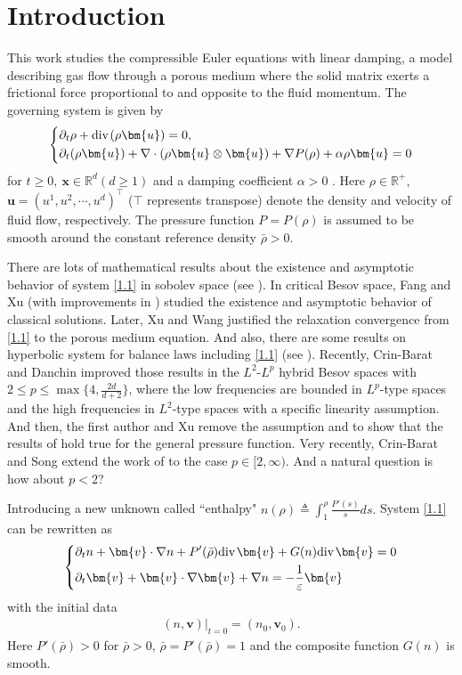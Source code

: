 \documentclass{amsart}
\theoremstyle{definition}
\theoremstyle{remark}
\numberwithin{equation}{section}
\def\d{\partial}
\renewcommand{\div}{\mbox{\rm div}\;\!}
\def\bu{{\bm{u} }}
\def\bx{\bm{x}}
\def\bv{{\bm{v} }}
\newcommand\R{\mathbb{R}}
\begin{document}
\section{Introduction}
This work studies the compressible Euler equations with linear damping, a model describing gas flow through a porous medium where the solid matrix exerts a frictional force proportional to and opposite to the fluid momentum. The governing system is given by
\begin{eqnarray}\label{1.1}
\left\{\aligned
&\d_t \rho+\div (\rho \bu)=0, \\
&\d_t (\rho \bu)+\nabla \cdot (\rho \bu\otimes \bu)+\nabla P(\rho)+\alpha\rho \bu=0
\endaligned\right.
\end{eqnarray}
for $t\geq0,\ \bx\in \R^d(d\geq 1)$ and a damping coefficient $\alpha>0$
. Here $\rho\in\mathbb{R}^{+}$, $\bu=(u^1, u^2,\cdots, u^d)^\top$ ($\top$ represents transpose) denote the density and velocity of fluid flow, respectively. The pressure function $P=P(\rho)$ is assumed to be smooth around the constant reference density $\bar{\rho}>0$.

There are lots of mathematical results about the existence and asymptotic behavior of system \eqref{1.1} in sobolev space (see \cite{HL,HuangFM2,Wangdehua,Sui,Tan3,XY} ). In critical Besov space, Fang and Xu \cite{FXu} (with improvements in \cite{Jiu}) studied the existence and asymptotic behavior of classical solutions. Later, Xu and Wang \cite{XuWang} justified the relaxation convergence from \eqref{1.1} to the porous medium equation. And also, there are some results on hyperbolic system for balance laws including \eqref{1.1} (see \cite{XuKawaARM14,XuKawaARM15}). Recently, Crin-Barat and Danchin \cite{BaratDanchin,BaratDanchin2,BaratDanchin3} improved those results \cite{XuKawaARM14,XuKawaARM15,XuWang} in the $L^2$-$L^p$ hybrid Besov spaces with $2\leq p\leq\max\{4,\frac{2d}{d+2}\}$, where the low frequencies are bounded in $L^p$-type spaces and the high frequencies in $L^2$-type spaces with a specific linearity assumption. And then, the first author and Xu \cite{XuZhang} remove the assumption and to show that the results of \cite{BaratDanchin,BaratDanchin2} hold true for the general pressure function. Very recently, Crin-Barat and Song \cite{BSong} extend the work of \cite{BaratDanchin,BaratDanchin2,XuZhang} to the case $p\in[2,\infty)$. And a natural question is how about $p<2$?

Introducing a new unknown called ``enthalpy"
$n(\rho)\triangleq \int_1^{\rho} \frac{P'(s)}{s} ds.$ System \eqref{1.1} can be rewritten as
\begin{eqnarray}\label{1.2}
\left\{\aligned
&\d_t n + \bv \cdot  \nabla n + P'(\bar{\rho})\div \bv + G(n)\div \bv = 0 \\
&\d_t \bv+ \bv\cdot \nabla \bv+\nabla n= -\frac{1}{\varepsilon} \bv
\endaligned\right.
\end{eqnarray}
with the initial data
\begin{eqnarray}\label{1.2initial}
 (n,\bv)|_{t=0}=(n_0, \bv_0).
\end{eqnarray}
Here $P'(\bar{\rho})>0$ for $\bar{\rho}>0$, $\bar{\rho}=P'(\bar{\rho})=1$ and the composite function $G(n)$ is smooth.
\end{document}
